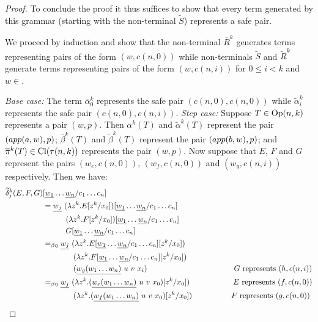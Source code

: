 \begin{proof}
To conclude the proof it thus suffices to show that every term generated by this grammar (starting with the non-terminal $\widetilde S$) represents a safe pair.

We proceed by induction and show that the non-terminal $\overline
R^k$ generates terms representing pairs of the form $(w,c(n,0))$
while non-terminals $\widetilde S$ and $\widetilde R^k$ generate
terms representing pairs of the form $(w,c(n,i))$ for $0 \leq i<k$
and $w \in$\safedefset.

\emph{Base case:} The term $\overline\alpha_0^k$ represents the safe pair $(c(n,0),c(n,0))$ while
$\widetilde\alpha_i^k$ represents the safe pair
$(c(n,0),c(n,i))$. \emph{Step case:} Suppose $T\in
{\rm Op}(n,k)$ represents
 a pair $(w,p)$.  Then $\overline\alpha^k(T)$ and
 $\widetilde\alpha^k(T)$ represent the pair
 $(\mathop{app}(a,w),p)$; $\overline\beta^k(T)$ and
 $\widetilde\beta^k(T)$ represent the pair
 $(\mathop{app}(b,w),p)$; and $\overline\pi^k(T) \in {\rm Cl}(\tau(n,k))$ represents the pair $(w,p)$. Now suppose that $E$, $F$ and $G$ represent the pairs
 $(w_e,c(n,0))$, $(w_f,c(n,0))$ and $(w_g,c(n,i))$ respectively.
 Then we have:
 \begin{alignat*}{2}
   \widetilde \delta^k_j (E,F,G) &[\zaioncencode{w_1}\ldots \zaioncencode{w_n}/c_1\ldots c_n] \\
   &= \zaioncencode{w_j}\  (\lambda z^k. E[z^k/x_0])[\zaioncencode{w_1}\ldots \zaioncencode{w_n}/c_1\ldots c_n] \\
       & \qquad\quad (\lambda z^k. F[z^k/x_0])[\zaioncencode{w_1}\ldots \zaioncencode{w_n}/c_1\ldots c_n] \\
       & \qquad\quad  G[\zaioncencode{w_1}\ldots \zaioncencode{w_n}/c_1\ldots c_n] \\
   &=_{\beta\eta} \zaioncencode{w_j}\  (\lambda z^k. E[\zaioncencode{w_1}\ldots \zaioncencode{w_n}/c_1\ldots c_n][z^k/x_0]) \\
       & \qquad\qquad (\lambda z^k. F[\zaioncencode{w_1}\ldots \zaioncencode{w_n}/c_1\ldots c_n][z^k/x_0]) \\
       & \qquad\qquad  (\zaioncencode{w_g(w_1\ldots w_n)}~u~v~x_i) \hspace{4cm}\mbox{$G$ represents $(h,c(n,i))$}\\
   &=_{\beta\eta} \zaioncencode{w_j}\  (\lambda z^k. (\zaioncencode{w_e(w_1\ldots w_n)}~u~v~x_0)[z^k/x_0]) \hspace{2cm}\mbox{$E$ represents $(f,c(n,0))$} \\
       & \qquad\qquad (\lambda z^k. (\zaioncencode{w_f(w_1\ldots w_n)}~u~v~x_0)[z^k/x_0]) \hspace{1.8cm}\mbox{$F$ represents $(g,c(n,0))$} \\

\end{alignat*}
\end{proof}

